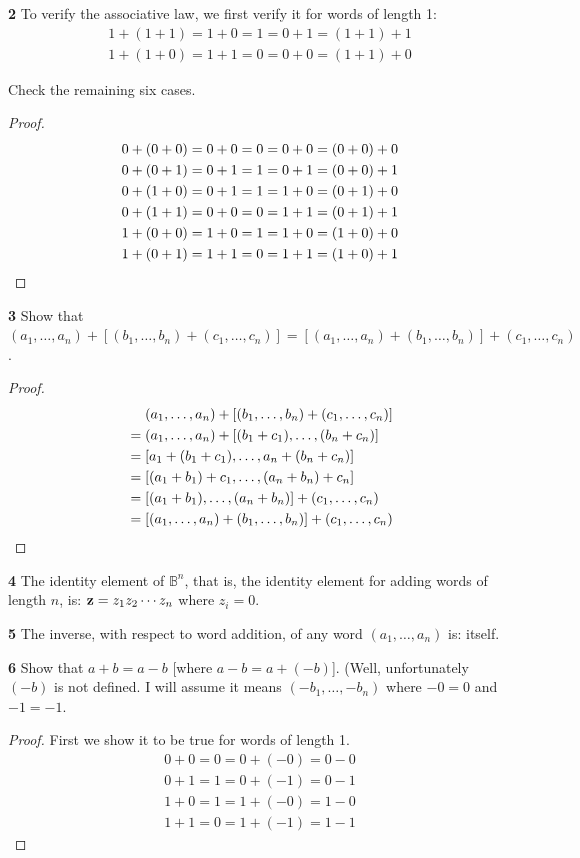 \documentclass[twoside]{amsart}
\newcommand{\Blank}{\mathrel{\phantom{=}}}
\begin{document}
\begin{enumerate}[A.]
   \noindent \textbf{2} To verify the associative law, we first verify
   it for words of length 1:
   \begin{gather*}
      1 + (1 + 1) = 1 + 0 = 1 = 0 + 1 = (1 + 1) + 1 \\
      1 + (1 + 0) = 1 + 1 = 0 = 0 + 0 = (1 + 1) + 0
   \end{gather*}

   \noindent Check the remaining six cases.
   \begin{proof}
      \begin{gather*}
	 0 + (0 + 0) = 0 + 0 = 0 = 0 + 0 = (0 + 0) + 0 \\
	 0 + (0 + 1) = 0 + 1 = 1 = 0 + 1 = (0 + 0) + 1 \\
	 0 + (1 + 0) = 0 + 1 = 1 = 1 + 0 = (0 + 1) + 0 \\
	 0 + (1 + 1) = 0 + 0 = 0 = 1 + 1 = (0 + 1) + 1 \\
         1 + (0 + 0) = 1 + 0 = 1 = 1 + 0 = (1 + 0) + 0 \\
	 1 + (0 + 1) = 1 + 1 = 0 = 1 + 1 = (1 + 0) + 1 \qedhere
      \end{gather*}
   \end{proof}

   \noindent \textbf{3} Show that $(a_1,\ldots,a_n)+[(b_1,\ldots,b_n)+
   (c_1,\ldots,c_n)]=[(a_1,\ldots,a_n)+(b_1,\ldots,b_n)]+(c_1,\ldots,c_n)$.
   \begin{proof}
      \begin{align*}
         & \Blank (a_1,\ldots,a_n)+[(b_1,\ldots,b_n)+(c_1,\ldots,c_n)] \\
	 & = (a_1,\ldots,a_n)+[(b_1+c_1),\ldots,(b_n+c_n)] \\
	 & = [a_1+(b_1+c_1),\ldots,a_n+(b_n+c_n)] \\
	 & = [(a_1+b_1)+c_1,\ldots,(a_n+b_n)+c_n] \\
	 & = [(a_1+b_1),\ldots,(a_n+b_n)]+(c_1,\ldots,c_n)\\
	 & = [(a_1,\ldots,a_n)+(b_1,\ldots,b_n)]+(c_1,\ldots,c_n) \qedhere
      \end{align*}
   \end{proof}

   \noindent \textbf{4} The identity element of $\mathbb{B}^n$, that is,
   the identity element for adding words of length $n$, is: 
   $\mathbf{z} = z_1 z_2 \cdots z_n$ where $z_i = 0$.

   \noindent \textbf{5} The inverse, with respect to word addition, of any
   word $(a_1,\ldots,a_n)$ is: itself.

   \noindent \textbf{6} Show that $a+b=a-b$ [where $a-b=a+(-b)$]. (Well, 
   unfortunately $(-b)$ is not defined. I will assume it means 
   $(-b_1,\ldots,-b_n)$ where $-0 = 0$ and $-1 = -1$.
   \begin{proof}
      First we show it to be true for words of length 1.
      \begin{gather*}
         0 + 0 = 0 = 0 + (-0) = 0 - 0 \\
	 0 + 1 = 1 = 0 + (-1) = 0 - 1 \\
	 1 + 0 = 1 = 1 + (-0) = 1 - 0 \\
	 1 + 1 = 0 = 1 + (-1) = 1 - 1 
      \end{gather*}


\end{proof}
\end{enumerate}
\end{document}

